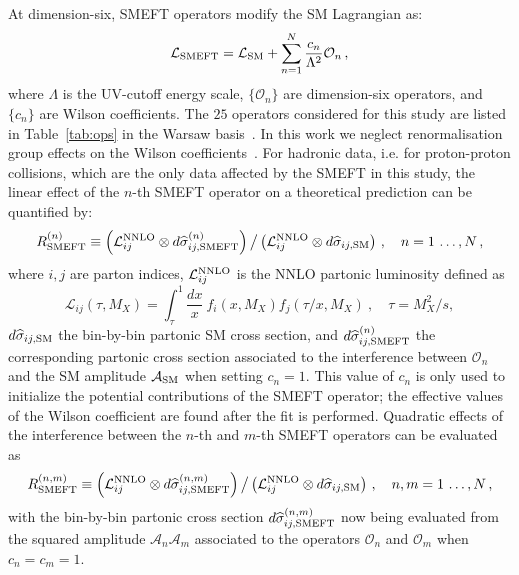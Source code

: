 \documentclass[withindex,glossary]{cam-thesis}
\begin{document}
At dimension-six, SMEFT operators modify the SM Lagrangian as:
\begin{equation}
    \label{eq:lagrangian}
    \mathcal{L}_{\rm SMEFT} = \mathcal{L}_{\rm SM} + \sum_{n=1}^{N} \frac{c_n}{\Lambda^2} \mathcal{O}_n \, ,
\end{equation}
%
where $\Lambda$ is the UV-cutoff energy scale, $\{\mathcal{O}_{n} \}$ are dimension-six operators, and
$\{ c_n \}$ are Wilson coefficients.
%
The $25$ operators considered for this study 
are listed in Table~\ref{tab:ops} in the Warsaw basis~\cite{Grzadkowski:2010es}.
%
In this work we neglect renormalisation group effects on the Wilson coefficients~\cite{Aoude:2022aro}. 
%
For hadronic data, i.e. for proton-proton collisions, which are the only data affected by the SMEFT in this study,
 the linear effect of the $n$-th SMEFT operator on a theoretical prediction can be quantified by:
%
\begin{equation}
  \label{eq:mult_k_fac_app1}
   R_{\rm SMEFT}^{(n)} \equiv \displaystyle \left( {\cal L}_{ ij}^{\rm NNLO} \otimes d\widehat{\sigma}_{ij,{\rm SMEFT}}^{(n)}\right)
 \big/ \left( {\cal L}_{ ij}^{\rm NNLO} \otimes d\widehat{\sigma}_{ij,{\rm SM}} \right) \, , \quad
 n=1\,\ldots, N \, ,
\end{equation}
%
where $i, j$ are parton indices, ${\cal L}_{ ij}^{\rm NNLO}$ is the NNLO partonic luminosity defined as 
%
\begin{equation}
\label{eq:lumidef}
\mathcal{L}_{ij}(\tau,M_X) = \int_{\tau}^1 \frac{d x}{x}~f_i (x,M_X) f_j (\tau/x,M_X) ~, \quad \tau=M_X^2/s,
\end{equation}
%
$d\widehat{\sigma}_{ij,{\rm SM}}$ the bin-by-bin partonic SM cross section, and $d\widehat{\sigma}_{ij,{\rm SMEFT}}^{(n)}$
the corresponding partonic cross section associated to the interference between 
$\mathcal{O}_n$ and the SM amplitude $\mathcal{A}_{\rm SM}$ when setting $c_n = 1$. This value of $c_n$ 
is only used to initialize the potential contributions of the
SMEFT operator; the effective values of the Wilson coefficient 
are found after the fit is performed. 
%
Quadratic effects of the interference between the $n$-th and $m$-th
SMEFT operators can be evaluated as
%
\begin{equation}
  \label{eq:mult_k_fac_app2}
  R_{\rm SMEFT}^{(n,m)} \equiv \displaystyle \left( {\cal L}_{ ij}^{\rm NNLO} \otimes d\widehat{\sigma}_{ij,{\rm SMEFT}}^{(n,m)}\right)
  \big/ \left( {\cal L}_{ ij}^{\rm NNLO} \otimes d\widehat{\sigma}_{ij,{\rm SM}} \right) \, , \quad
 n,m=1\,\ldots, N \, ,
\end{equation}
with the bin-by-bin partonic cross section
$d\widehat{\sigma}_{ij,{\rm SMEFT}}^{(n,m)}$ now being evaluated from the squared amplitude $\mathcal{A}_n\mathcal{A}_m$
associated to the operators $\mathcal{O}_n$ and $\mathcal{O}_m$ when $c_n = c_m = 1$.
\end{document}
